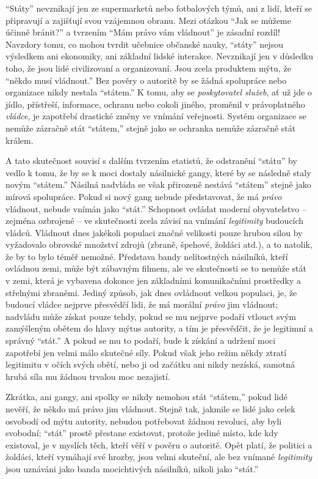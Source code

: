 \documentclass{book}
\begin{document}
\enquote{Státy} nevznikají jen ze supermarketů nebo fotbalových týmů, ani z lidí, kteří se připravují a zajišťují svou vzájemnou obranu. Mezi otázkou \enquote{Jak se můžeme účinně bránit?} a tvrzením \enquote{Mám právo vám vládnout} je zásadní rozdíl! Navzdory tomu, co mohou tvrdit učebnice občanské nauky, \enquote{státy} nejsou výsledkem ani ekonomiky, ani základní lidské interakce. Nevznikají jen v důsledku toho, že jsou lidé civilizovaní a organizovaní. Jsou zcela produktem mýtu, že \enquote{někdo musí vládnout.} Bez pověry o autoritě by se žádná spolupráce nebo organizace nikdy nestala \enquote{státem.} K tomu, aby se \emph{poskytovatel služeb}, ať už jde o jídlo, přístřeší, informace, ochranu nebo cokoli jiného, proměnil v právoplatného \emph{vládce}, je zapotřebí drastické změny ve vnímání veřejnosti. Systém organizace se nemůže zázračně stát \enquote{státem,} stejně jako se ochranka nemůže zázračně stát králem.

A tato skutečnost souvisí s dalším tvrzením etatistů, že odstranění \enquote{státu} by vedlo k tomu, že by se k moci dostaly násilnické gangy, které by se následně staly novým \enquote{státem.} Násilná nadvláda se však přirozeně nestává \enquote{státem} stejně jako mírová spolupráce. Pokud si nový gang nebude představovat, že má \emph{právo} vládnout, nebude vnímán jako \enquote{stát.} Schopnost ovládat moderní obyvatelstvo -- zejména ozbrojené -- ve skutečnosti zcela závisí na vnímání \emph{legitimity} budoucích vládců. Vládnout dnes jakékoli populaci značné velikosti pouze hrubou silou by vyžadovalo obrovské množství zdrojů (zbraně, špehové, žoldáci atd.), a to natolik, že by to bylo téměř nemožné. Představa bandy nelítostných násilníků, kteří ovládnou zemi, může být zábavným filmem, ale ve skutečnosti se to nemůže stát v zemi, která je vybavena dokonce jen základními komunikačními prostředky a střelnými zbraněmi. Jediný způsob, jak dnes ovládnout velkou populaci, je, že budoucí vládce nejprve přesvědčí lidi, že má morální \emph{právo} jim vládnout; nadvládu může získat pouze tehdy, pokud se mu nejprve podaří vtlouct svým zamýšleným obětem do hlavy mýtus autority, a tím je přesvědčit, že je legitimní a správný \enquote{stát.} A pokud se mu to podaří, bude k získání a udržení moci zapotřebí jen velmi málo skutečné síly. Pokud však jeho režim někdy ztratí legitimitu v očích svých obětí, nebo ji od začátku ani nikdy nezíská, samotná hrubá síla mu žádnou trvalou moc nezajistí.

Zkrátka, ani gangy, ani spolky se nikdy nemohou stát \enquote{státem,} pokud lidé nevěří, že někdo má právo jim vládnout. Stejně tak, jakmile se lidé jako celek osvobodí od mýtu autority, nebudou potřebovat žádnou revoluci, aby byli svobodní; \enquote{stát} prostě přestane existovat, protože jediné místo, kde kdy existoval, je v myslích těch, kteří věří v pověru o autoritě. Opět platí, že politici a žoldáci, kteří vymáhají své hrozby, jsou velmi skuteční, ale bez vnímané \emph{legitimity} jsou uznáváni jako banda mocichtivých násilníků, nikoli jako \enquote{stát.}
\end{document}
